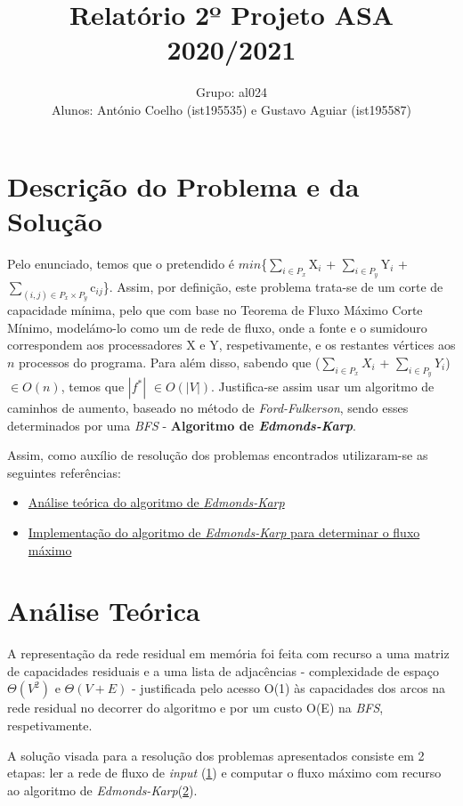 \documentclass[12pt]{article}
\author{
	Grupo: al024\\Alunos: António Coelho (ist195535) e Gustavo Aguiar (ist195587)
}
\title{\vspace{-2cm}Relatório 2º Projeto ASA 2020/2021}
\date{}
\begin{document}
\maketitle
\section{Descrição do Problema e da Solução}
Pelo enunciado, temos que o pretendido é $min$\{$\sum_{i\in{P_{x}}}$X$_{i}$ + $\sum_{i\in{P_{y}}}$Y$_{i}$ + $\sum_{(i, j)\in{P_{x} \times P_{y}}}$c$_{ij}$\}. Assim, por definição, este problema trata-se de um corte de capacidade mínima, pelo que com base no Teorema de Fluxo Máximo Corte Mínimo, modelámo-lo como um de rede de fluxo, onde a fonte e o sumidouro correspondem aos processadores X e Y, respetivamente, e os restantes vértices aos $n$ processos do programa.
Para além disso, sabendo que ($\sum_{i\in{P_{x}}}$$X_{i}$ + $\sum_{i\in{P_{y}}}$$Y_{i}$) $\in{O(n)}$, temos que $\left|f^{*}\right|$ $\in{O(\left|V\right|)}$. Justifica-se assim usar um algoritmo de caminhos de aumento, baseado no método de \emph{Ford-Fulkerson}, sendo esses determinados por uma \emph{BFS} - \textbf{Algoritmo de \emph{Edmonds-Karp}}.

Assim, como auxílio de resolução dos problemas encontrados utilizaram-se as seguintes referências:
\begin{itemize}
\item\href{https://brilliant.org/wiki/edmonds-karp-algorithm/}{Análise teórica do algoritmo de \emph{Edmonds-Karp}}
\item\href{https://www.geeksforgeeks.org/ford-fulkerson-algorithm-for-maximum-flow-problem/}{Implementação do algoritmo de \emph{Edmonds-Karp} para determinar o fluxo máximo}
\end{itemize}
 
 \section{Análise Teórica}
 A representação da rede residual em memória foi feita com recurso a uma matriz de capacidades residuais e a uma lista de adjacências - complexidade de espaço $\Theta{(V^2)}$ e $\Theta{(V+E)}$ - justificada pelo acesso O(1) às capacidades dos arcos na rede residual no decorrer do algoritmo e por um custo O(E) na \emph{BFS}, respetivamente.

A solução visada para a resolução dos problemas apresentados consiste em 2 etapas: ler a rede de fluxo de \emph{input} (\underline{1}) e computar o fluxo máximo com recurso ao algoritmo de \emph{Edmonds-Karp}(\underline{2}).
\end{document}
